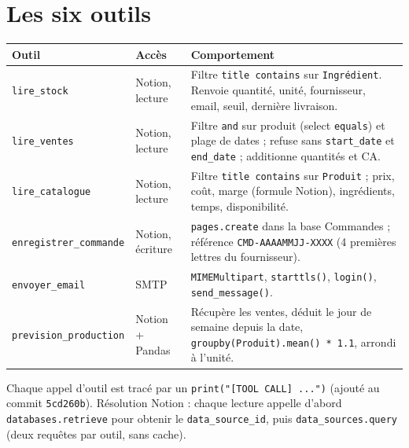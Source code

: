 \documentclass[10.5pt,a4paper]{article}
\newcommand{\code}[1]{\texttt{#1}}
\begin{document}
\section{Les six outils}
\begin{center}\small
\begin{tabular}{@{}L{3.6cm} L{2.3cm} L{9.6cm}@{}}
\toprule
\textbf{Outil} & \textbf{Accès} & \textbf{Comportement} \\
\midrule
\code{lire\_stock} & Notion, lecture & Filtre \code{title contains} sur \code{Ingrédient}. Renvoie quantité, unité, fournisseur, email, seuil, dernière livraison. \\
\code{lire\_ventes} & Notion, lecture & Filtre \code{and} sur produit (select \code{equals}) et plage de dates ; refuse sans \code{start\_date} et \code{end\_date} ; additionne quantités et CA. \\
\code{lire\_catalogue} & Notion, lecture & Filtre \code{title contains} sur \code{Produit} ; prix, coût, marge (formule Notion), ingrédients, temps, disponibilité. \\
\code{enregistrer\_commande} & Notion, écriture & \code{pages.create} dans la base Commandes ; référence \code{CMD-AAAAMMJJ-XXXX} (4 premières lettres du fournisseur). \\
\code{envoyer\_email} & SMTP & \code{MIMEMultipart}, \code{starttls()}, \code{login()}, \code{send\_message()}. \\
\code{prevision\_production} & Notion + Pandas & Récupère les ventes, déduit le jour de semaine depuis la date, \code{groupby(Produit).mean() * 1.1}, arrondi à l'unité. \\
\bottomrule
\end{tabular}
\end{center}

Chaque appel d'outil est tracé par un \code{print("[TOOL CALL] ...")} (ajouté au commit \code{5cd260b}). Résolution Notion : chaque lecture appelle d'abord \code{databases.retrieve} pour obtenir le \code{data\_source\_id}, puis \code{data\_sources.query} (deux requêtes par outil, sans cache).
\end{document}
